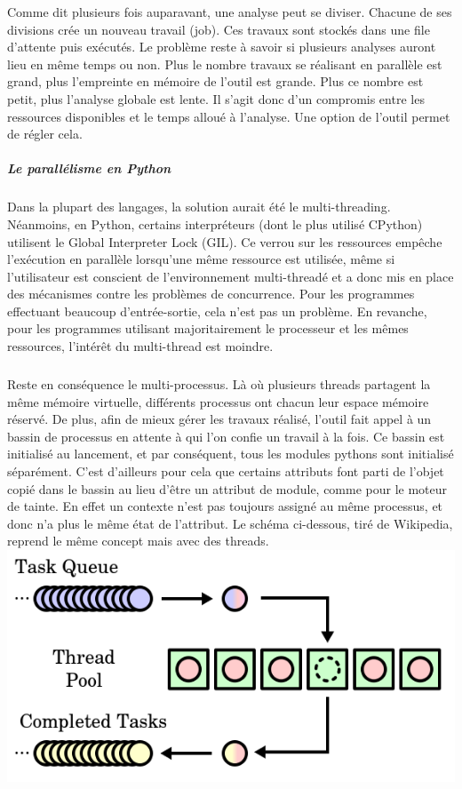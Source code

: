 Comme dit plusieurs fois auparavant, une analyse peut se diviser. Chacune de ses divisions crée un nouveau travail (job). Ces travaux sont stockés dans une file d'attente
puis exécutés. Le problème reste à savoir si plusieurs analyses auront lieu en même temps ou non. Plus le nombre travaux se réalisant en parallèle est grand, plus l'empreinte en mémoire de l'outil
est grande. Plus ce nombre est petit, plus l'analyse globale est lente. Il s'agit donc d'un compromis entre les ressources disponibles et le temps alloué à l'analyse. Une option de l'outil permet
de régler cela.
\subparagraph{Le parallélisme en Python}
Dans la plupart des langages, la solution aurait été le multi-threading. Néanmoins, en Python, certains interpréteurs (dont le plus utilisé CPython) utilisent le Global Interpreter Lock (GIL).
Ce verrou sur les ressources empêche l'exécution en parallèle lorsqu'une même ressource est utilisée, même si l'utilisateur est conscient de l'environnement multi-threadé et a donc mis en place
des mécanismes contre les problèmes de concurrence. Pour les programmes effectuant beaucoup d'entrée-sortie, cela n'est pas un problème. En revanche, pour les programmes utilisant majoritairement
le processeur et les mêmes ressources, l'intérêt du multi-thread est moindre.
\subparagraph{}
Reste en conséquence le multi-processus. Là où plusieurs threads partagent la même mémoire virtuelle, différents processus ont chacun leur espace mémoire réservé. De plus,
afin de mieux gérer les travaux réalisé, l'outil fait appel à un bassin de processus en attente à qui l'on confie un travail à la fois. Ce bassin est initialisé au lancement,
et par conséquent, tous les modules pythons sont initialisé séparément. C'est d'ailleurs pour cela que certains attributs font parti de l'objet copié dans le bassin au lieu d'être
un attribut de module, comme pour le moteur de tainte. En effet un contexte n'est pas toujours assigné au même processus, et donc n'a plus le même état de l'attribut.
Le schéma ci-dessous, tiré de Wikipedia, reprend le même concept mais avec des threads.
\includegraphics[scale=0.5]{threadpool.png}\newline

